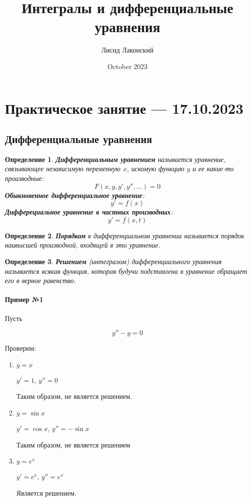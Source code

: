 \documentclass{article}
\title{Интегралы и дифференциальные уравнения}
\author{Лисид Лаконский}
\date{October 2023}
\newtheorem{definition}{Определение}
\begin{document}
\raggedright

\maketitle

\tableofcontents
\pagebreak

\section{Практическое занятие — 17.10.2023}

\subsection{Дифференциальные уравнения}

\begin{definition}
    \textbf{Дифференциальным уравнением} называется уравнение, связывающее независимую переменную $x$, искомую функцию $y$ и ее какие-то производные:
    $$
    F(x, y, y', y'', \dots) = 0
    $$
    \textbf{Обыкновенное дифференциальное уравнение}:
    $$
    y' = f(x)
    $$
    \textbf{Дифферециальное уравнение в частных производных}:
    $$
    y' = f(x, t)
    $$
\end{definition}

\begin{definition}
    \textbf{Порядком} в дифференциальном уравнении называется порядок наивысшей производной, входящей в это уравнение.
\end{definition}

\begin{definition}
    \textbf{Решением} (интегралом) дифференциального уравнения называется всякая функция, которая будучи подставлена в уравнение обращает его в верное равенство.
\end{definition}

\paragraph{Пример №1}

Пусть

$$y'' - y = 0$$

Проверим:

\begin{enumerate}
    \item $y = x$

    $y' = 1$, $y'' = 0$

    Таким образом, не является решением.
    \item $y = \sin x$

    $y' = \cos x$, $y'' = -\sin x$

    Таким образом, не является решением
    \item $y = e^{x}$

    $y' = e^{x}$, $y'' = e^{x}$

    Является решением.
\end{enumerate}
\end{document}
